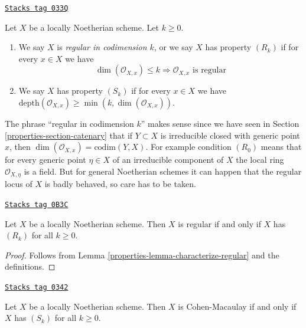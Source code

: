 \begin{definition}[Rk]
\label{properties-definition-Rk}
\href{https://stacks.math.columbia.edu/tag/033Q}{\texttt{Stacks tag 033Q}}

Let $X$ be a locally Noetherian scheme. Let $k \geq 0$.
\begin{enumerate}
\item We say $X$ is {\it regular in codimension $k$},
or we say $X$ has property {\it $(R_k)$} if for every $x \in X$
we have
$$
\dim(\mathcal{O}_{X, x}) \leq k
\Rightarrow
\mathcal{O}_{X, x}\text{ is regular}
$$
\item We say $X$ has property {\it $(S_k)$} if for every $x \in X$ we have
$\text{depth}(\mathcal{O}_{X, x}) \geq \min(k, \dim(\mathcal{O}_{X, x}))$.
\end{enumerate}
\end{definition}

The phrase ``regular in codimension $k$'' makes sense since we have seen
in Section \ref{properties-section-catenary} that if $Y \subset X$ is irreducible
closed with generic point $x$, then
$\dim(\mathcal{O}_{X, x}) = \text{codim}(Y, X)$. For example condition
$(R_0)$ means that for every generic point $\eta \in X$ of an irreducible
component of $X$ the local ring $\mathcal{O}_{X, \eta}$ is a field.
But for general Noetherian schemes it can happen that the regular locus
of $X$ is badly behaved, so care has to be taken.

\begin{lemma}
\label{properties-lemma-scheme-regular-iff-all-Rk}
\href{https://stacks.math.columbia.edu/tag/0B3C}{\texttt{Stacks tag 0B3C}}

Let $X$ be a locally Noetherian scheme.
Then $X$ is regular if and only if $X$ has $(R_k)$ for all $k \geq 0$.
\end{lemma}

\begin{proof}

Follows from Lemma \ref{properties-lemma-characterize-regular} and the definitions.
\end{proof}

\begin{lemma}
\label{properties-lemma-scheme-CM-iff-all-Sk}
\href{https://stacks.math.columbia.edu/tag/0342}{\texttt{Stacks tag 0342}}

Let $X$ be a locally Noetherian scheme.
Then $X$ is Cohen-Macaulay if and only if $X$ has $(S_k)$ for all $k \geq 0$.
\end{lemma}

